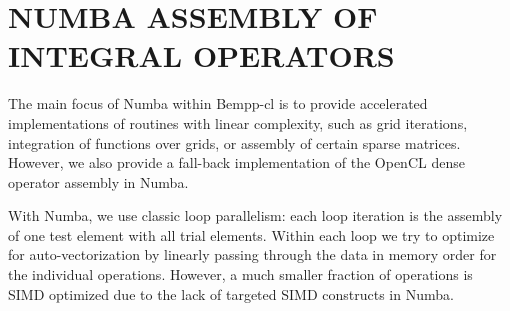 \section{NUMBA ASSEMBLY OF INTEGRAL OPERATORS}
The main focus of Numba within Bempp-cl is to provide accelerated implementations of routines with linear complexity, such as grid iterations, integration of functions over grids, or assembly of certain sparse matrices. However, we also provide a fall-back implementation of the OpenCL dense operator assembly in Numba.

With Numba, we use classic loop parallelism: each loop iteration is the assembly of one test element with all trial elements. Within each loop we try to optimize for auto-vectorization by linearly passing through the data in memory order for the individual operations. However, a much smaller fraction of operations is SIMD optimized due to the lack of targeted SIMD constructs in Numba.
